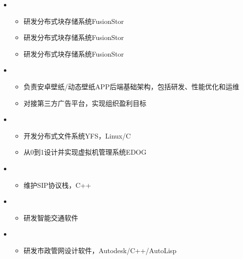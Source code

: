 \begin{itemize}[leftmargin=*]
    \item 
        {\small
        \begin{itemize}
            \item 研发分布式块存储系统FusionStor
            \item 研发分布式块存储系统FusionStor
            \item 研发分布式块存储系统FusionStor
        \end{itemize}
        }
    \item
        {\small
        \begin{itemize}
            \item 负责安卓壁纸/动态壁纸APP后端基础架构，包括研发、性能优化和运维
            \item 对接第三方广告平台，实现组织盈利目标
        \end{itemize}
        }
    \item
        {\small
        \begin{itemize}
            \item 开发分布式文件系统YFS，Linux/C
            \item 从0到1设计并实现虚拟机管理系统EDOG
        \end{itemize}
        }
    \item 
        {\small
        \begin{itemize}
            \item 维护SIP协议栈，C++
        \end{itemize}
        }
    \item 
        {\small
        \begin{itemize}
            \item 研发智能交通软件
        \end{itemize}
        }
    \item 
        {\small
        \begin{itemize}
            \item 研发市政管网设计软件，Autodesk/C++/AutoLisp
        \end{itemize}
        }
\end{itemize}
